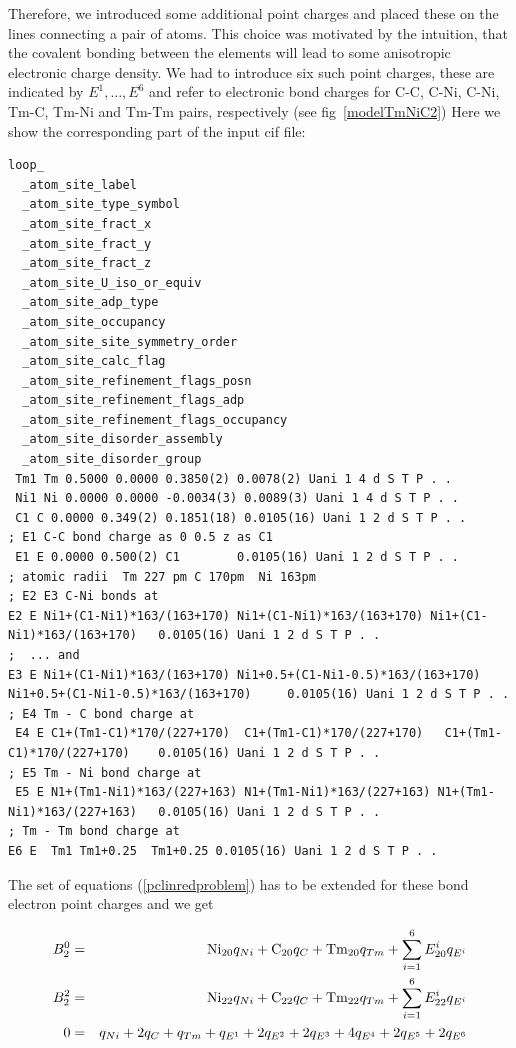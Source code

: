 Therefore, we introduced some additional point charges and placed these on the lines connecting
a pair of atoms. This choice was motivated by the intuition, that the covalent bonding between
the elements will lead to some anisotropic electronic charge density. We had to introduce 
six such point charges, these are indicated by $E^1, \dots, E^6$ and refer to electronic bond
charges for  C-C, C-Ni, C-Ni, Tm-C, Tm-Ni and Tm-Tm pairs, respectively (see fig~\ref{modelTmNiC2}) 
 Here we show the corresponding part of the input cif file:

\begin{verbatim}
loop_
  _atom_site_label
  _atom_site_type_symbol
  _atom_site_fract_x
  _atom_site_fract_y
  _atom_site_fract_z
  _atom_site_U_iso_or_equiv
  _atom_site_adp_type
  _atom_site_occupancy
  _atom_site_site_symmetry_order
  _atom_site_calc_flag
  _atom_site_refinement_flags_posn
  _atom_site_refinement_flags_adp
  _atom_site_refinement_flags_occupancy
  _atom_site_disorder_assembly
  _atom_site_disorder_group
 Tm1 Tm 0.5000 0.0000 0.3850(2) 0.0078(2) Uani 1 4 d S T P . .
 Ni1 Ni 0.0000 0.0000 -0.0034(3) 0.0089(3) Uani 1 4 d S T P . .
 C1 C 0.0000 0.349(2) 0.1851(18) 0.0105(16) Uani 1 2 d S T P . .
; E1 C-C bond charge as 0 0.5 z as C1
 E1 E 0.0000 0.500(2) C1        0.0105(16) Uani 1 2 d S T P . .
; atomic radii  Tm 227 pm C 170pm  Ni 163pm
; E2 E3 C-Ni bonds at 
E2 E Ni1+(C1-Ni1)*163/(163+170) Ni1+(C1-Ni1)*163/(163+170) Ni1+(C1-Ni1)*163/(163+170)   0.0105(16) Uani 1 2 d S T P . .
;  ... and
E3 E Ni1+(C1-Ni1)*163/(163+170) Ni1+0.5+(C1-Ni1-0.5)*163/(163+170) Ni1+0.5+(C1-Ni1-0.5)*163/(163+170)	  0.0105(16) Uani 1 2 d S T P . .
; E4 Tm - C bond charge at
 E4 E C1+(Tm1-C1)*170/(227+170)  C1+(Tm1-C1)*170/(227+170)   C1+(Tm1-C1)*170/(227+170)    0.0105(16) Uani 1 2 d S T P . .
; E5 Tm - Ni bond charge at
 E5 E N1+(Tm1-Ni1)*163/(227+163) N1+(Tm1-Ni1)*163/(227+163) N1+(Tm1-Ni1)*163/(227+163)   0.0105(16) Uani 1 2 d S T P . .
; Tm - Tm bond charge at
E6 E  Tm1 Tm1+0.25  Tm1+0.25 0.0105(16) Uani 1 2 d S T P . .
\end{verbatim}



The set of equations (\ref{pclinredproblem}) has to be extended for these bond electron point charges and
we get

\begin{eqnarray}\label{pclinproblem}
B_2^0 &=& {\rm Ni}_{20} q_{Ni}+{\rm C}_{20} q_{C}+{\rm Tm}_{20} q_{Tm}+\sum_{i=1}^6 E^i_{20} q_{E^i} \nonumber \\
B_2^2 &=& {\rm Ni}_{22} q_{Ni}+{\rm C}_{22} q_{C}+{\rm Tm}_{22} q_{Tm} +\sum_{i=1}^6 E^i_{22} q_{E^i} \nonumber \\
0 &=& q_{Ni}+2 q_{C}+ q_{Tm} +q_{E^1}+2q_{E^2}+2q_{E^3}+4q_{E^4}+2q_{E^5}+2q_{E^6}
\end{eqnarray}


